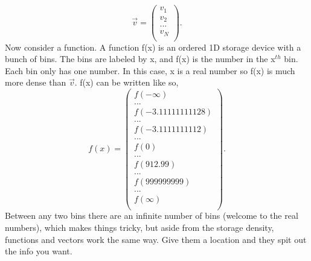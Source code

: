 \documentclass[12pt]{article}
\begin{document}
\begin{equation}
\vec{v} = 
\begin{pmatrix}
v_1 \\
v_2 \\
... \\
v_N \\
\end{pmatrix}.
\end{equation}
Now consider a function. A function f(x) is an ordered 1D storage device with a bunch of bins. The bins are labeled by x, and f(x) is the number in the x$^{th}$ bin. Each bin only has one number. In this case, x is a real number so f(x) is much more dense than $\vec{v}$. f(x) can be written like so,  
\begin{equation}
f(x) = 
\begin{pmatrix}
f(-\infty) \\
... \\
f(-3.11111111128) \\
... \\
f(-3.1111111112) \\
... \\
f(0) \\
... \\
f(912.99) \\
... \\
f(999999999) \\
... \\
f(\infty) \\
\end{pmatrix}.
\end{equation}
Between any two bins there are an infinite number of bins (welcome to the real numbers), which makes things tricky, but aside from the storage density, functions and vectors work the same way. Give them a location and they spit out the info you want. 

\end{document}
